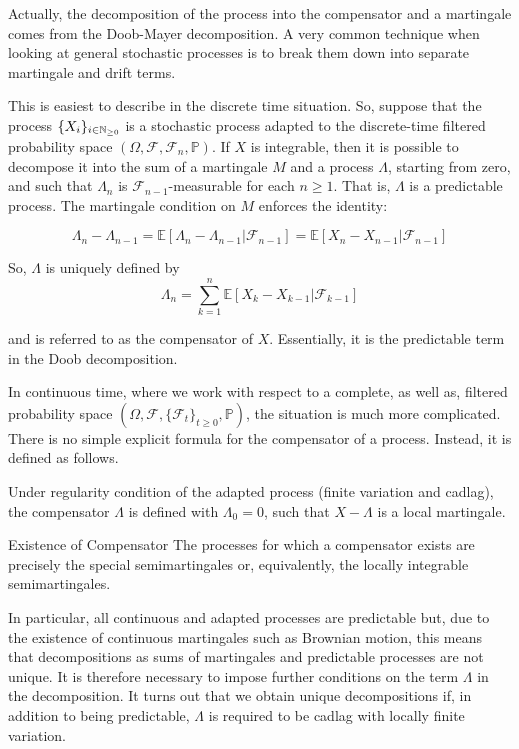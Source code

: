 \documentclass[11pt]{book}
\newcommand{\sequence}[1]{\{ #1 \}_{ i \in \N} }
\begin{document}
Actually, the decomposition of the process into the compensator and a martingale comes from the Doob-Mayer decomposition. A very common technique when looking at general stochastic processes is to break them down into separate martingale and drift terms. 

This is easiest to describe in the discrete time situation. So, suppose that the process $\sequence{X_i}$  is a stochastic process adapted to the discrete-time filtered probability space  $(\Omega, \mathcal F, \mathcal F_n, \mathbb P )$. If $X$ is integrable, then it is possible to decompose it into the sum of a martingale $M$ and a process $\Lambda$, starting from zero, and such that $\Lambda_n$ is $\mathcal{F}_{n-1}$-measurable for each $n\ge1$. That is, $\Lambda$ is a predictable process. The martingale condition on $M$ enforces the identity:

\begin{equation}
\Lambda_n-\Lambda_{n-1}={\mathbb E}[\Lambda_n-\Lambda_{n-1}\vert\mathcal{F}_{n-1}]={\mathbb E}[X_n-X_{n-1}\vert\mathcal{F}_{n-1}]
\end{equation}

So, $\Lambda$ is uniquely defined by
\begin{equation}
\Lambda_n=\sum_{k=1}^n{\mathbb E}\left[X_k-X_{k-1}\vert\mathcal{F}_{k-1}\right]
\end{equation}

and is referred to as the compensator of $X$. Essentially, it is the predictable term in the Doob decomposition.


In continuous time, where we work with respect to a complete, as well as, filtered probability space $(\Omega,\mathcal{F},\{\mathcal{F}_t\}_{t\ge0},{\mathbb P})$, the situation is much more complicated. There is no simple explicit formula for the compensator of a process. Instead, it is defined as follows.

Under regularity condition of the adapted process (finite variation and cadlag), the compensator $\Lambda $ is defined with $\Lambda_0=0$, such that $X-\Lambda$ is a local martingale. 


\begin{theoreme}{Existence of Compensator}
The processes for which a compensator exists are precisely the special semimartingales or, equivalently, the locally integrable semimartingales. 
\end{theoreme}

In particular, all continuous and adapted processes are predictable but, due to the existence of continuous martingales such as Brownian motion, this means that decompositions as sums of martingales and predictable processes are not unique. It is therefore necessary to impose further conditions on the term $\Lambda$ in the decomposition. It turns out that we obtain unique decompositions if, in addition to being predictable, $\Lambda$ is required to be cadlag with locally finite variation. 
\end{document}
